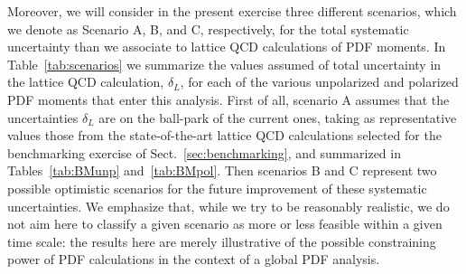 Moreover, we will consider in the present exercise three
different scenarios, which we denote
as Scenario A, B, and C, respectively, for the total systematic
uncertainty than we associate to lattice
QCD calculations of PDF moments.
%
In Table~\ref{tab:scenarios} we summarize the
values assumed of total uncertainty
    in the lattice QCD calculation, $\delta_L$, for each
    of the various unpolarized and polarized PDF moments that enter
    this analysis.
    First of all, scenario A assumes that the uncertainties $\delta_L$
    are on the ball-park of the current ones, taking as
    representative values  those from the
    state-of-the-art lattice QCD calculations
    selected for the benchmarking exercise of Sect.~\ref{sec:benchmarking},
    and summarized in Tables~\ref{tab:BMunp} and~\ref{tab:BMpol}.
    Then scenarios B and C represent two possible optimistic scenarios for the
    future improvement of these systematic uncertainties.
    We emphasize that, while we try to be reasonably
    realistic, we do not aim here to classify a given scenario
    as more or less feasible within a given time scale:
    the results here are merely illustrative of the possible
    constraining power of PDF calculations in the context
    of a global PDF analysis.

